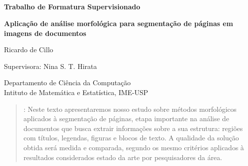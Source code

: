 \documentclass[a4paper,11pt]{article}
\begin{document}


\thispagestyle{empty}
\

\

\

\

\begin{center}
{\bf \Large Trabalho de Formatura Supervisionado}

\bigskip
\bigskip
{\bf \LARGE Aplicação de análise morfológica para segmentação de páginas em imagens de documentos}

\bigskip
{\large Ricardo de Cillo}

\bigskip
Supervisora: Nina S. T. Hirata 

\bigskip
Departamento de Ciência da Computação\\
Intituto de Matemática e Estatística, IME-USP
\end{center}


\bigskip
\begin{quote}
\begin{spacing}{1.2}
: Neste texto apresentaremos nosso estudo sobre métodos morfológicos aplicados à segmentação de páginas, etapa importante na análise de documentos que busca extrair informações sobre a sua estrutura: regiões com títulos, legendas, figuras e blocos de texto. A qualidade da solução obtida será medida e comparada, segundo os mesmo critérios aplicados à resultados considerados estado da arte por pesquisadores da área.
\end{spacing} 
\end{quote}

\end{document}
